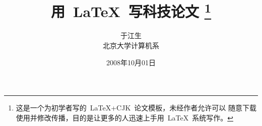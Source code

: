 \documentclass[a4paper,11pt,         %
               twoside,              %
               ]{article}
\begin{document}
\newcommand{\song}{\CJKfamily{song}} %
\newcommand{\hei}{\CJKfamily{hei}}   %
\newcommand{\fs}{\CJKfamily{fs}}     %
\newcommand{\kai}{\CJKfamily{kai}}   %

\newtheorem{example}{例}             %
\newtheorem{algorithm}{算法}
\newtheorem{theorem}{定理}[section]  %
\newtheorem{definition}{定义}
\newtheorem{axiom}{公理}
\newtheorem{property}{性质}
\newtheorem{proposition}{命题}
\newtheorem{lemma}{引理}
\newtheorem{corollary}{推论}
\newtheorem{remark}{注解}
\newtheorem{condition}{条件}
\newtheorem{conclusion}{结论}
\newtheorem{assumption}{假设}

\renewcommand{\contentsname}{目录}     %
\renewcommand{\abstractname}{摘\ \ 要} %
\renewcommand{\refname}{参考文献}      %
\renewcommand{\indexname}{索引}
\renewcommand{\figurename}{图}
\renewcommand{\tablename}{表}
\renewcommand{\appendixname}{附录}
\renewcommand{\proofname}{\hei 证明}
\renewcommand{\algorithm}{\hei 算法}

\newcommand{\yihao}{\fontsize{26pt}{36pt}\selectfont}       %
\newcommand{\erhao}{\fontsize{22pt}{28pt}\selectfont}       %
\newcommand{\xiaoer}{\fontsize{18pt}{18pt}\selectfont}      %
\newcommand{\sanhao}{\fontsize{16pt}{24pt}\selectfont}      %
\newcommand{\xiaosan}{\fontsize{15pt}{22pt}\selectfont}     %
\newcommand{\sihao}{\fontsize{14pt}{21pt}\selectfont}       %
\newcommand{\bansi}{\fontsize{13pt}{19.5pt}\selectfont}     %
\newcommand{\xiaosi}{\fontsize{12pt}{18pt}\selectfont}      %
\newcommand{\dawu}{\fontsize{11pt}{11pt}\selectfont}        %
\newcommand{\wuhao}{\fontsize{10.5pt}{10.5pt}\selectfont}   %

\rfoot{~\thepage~}

\title{用~\LaTeX~写科技论文            %
      \thanks{这是一个为初学者写的~\LaTeX+CJK~论文模板，未经作者允许可以
      随意下载使用并修改传播，目的是让更多的人迅速上手用~\LaTeX~系统写作。}
       }
\author{于江生\\                     %
        北京大学计算机系}
\date{2008年10月01日}                %
\maketitle                           %
\tableofcontents                     %
\thispagestyle{empty}                %
\end{document}
